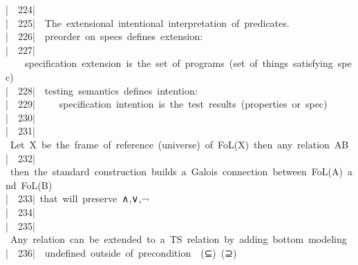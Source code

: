 \documentclass{article}
\newcommand{\syntaxCOMMENTC}[1]{\textcolor[rgb]{0.4,0.0,0.8}{#1}}
\newcommand{\syntaxCOMMENTC}[1]{\textcolor[rgb]{0.4,0.0,0.8}{#1}}
\newcommand{\syntaxCOMMENTC}[1]{\textcolor[rgb]{0.4,0.0,0.8}{#1}}
\newcommand{\syntaxCOMMENTC}[1]{\textcolor[rgb]{0.4,0.0,0.8}{\textbf{#1}}}
\newcommand{\syntaxCOMMENTC}[1]{\textcolor[rgb]{0.4,0.0,0.8}{#1}}
\newcommand{\syntaxCOMMENTC}[1]{\textcolor[rgb]{0.4,0.0,0.8}{#1}}
\newcommand{\syntaxCOMMENTC}[1]{\textcolor[rgb]{0.0,0.0,0.0}{#1}}
\newcommand{\gutter}[1]{\textcolor[rgb]{0,0,0}{{|}#1}}
\newcommand{\gutterH}[1]{\textcolor[rgb]{1,0,0}{{|}#1}}
\begin{document}
\gutter{\ \ 224{|}\ }\syntaxCOMMENTC{{\ }{\ }}\hspace*{\fill}\\
\gutterH{\ \ 225{|}\ }\syntaxCOMMENTC{{\ }The{\ }extensional{\ }intentional{\ }interpretation{\ }of{\ }predicates.}\hspace*{\fill}\\
\gutter{\ \ 226{|}\ }\syntaxCOMMENTC{{\ }preorder{\ }on{\ }specs{\ }defines{\ }extension:}\hspace*{\fill}\\
\gutter{\ \ 227{|}\ }\syntaxCOMMENTC{{\ }{\ }{\ }specification{\ }extension{\ }is{\ }the{\ }set{\ }of{\ }programs{\ }(set{\ }of{\ }things{\ }satisfying{\ }spec)}\hspace*{\fill}\\
\gutter{\ \ 228{|}\ }\syntaxCOMMENTC{{\ }testing{\ }semantics{\ }defines{\ }intention:}\hspace*{\fill}\\
\gutter{\ \ 229{|}\ }\syntaxCOMMENTC{{\ }{\ }{\ }{\ }specification{\ }intention{\ }is{\ }the{\ }test{\ }results{\ }(properties{\ }or{\ }spec)}\hspace*{\fill}\\
\gutterH{\ \ 230{|}\ }\hspace*{\fill}\\
\gutter{\ \ 231{|}\ }\syntaxCOMMENTC{Let{\ }X{\ }be{\ }the{\ }frame{\ }of{\ }reference{\ }(universe){\ }of{\ }FoL(X){\ }then{\ }any{\ }relation{\ }A\usebox{\lessthan}{-}\usebox{\greaterthan}B}\hspace*{\fill}\\
\gutter{\ \ 232{|}\ }\syntaxCOMMENTC{then{\ }the{\ }standard{\ }construction{\ }builds{\ }a{\ }Galois{\ }connection{\ }between{\ }FoL(A){\ }and{\ }FoL(B)}\hspace*{\fill}\\
\gutter{\ \ 233{|}\ }\syntaxCOMMENTC{that{\ }will{\ }preserve{\ }∧,∨,¬}\hspace*{\fill}\\
\gutter{\ \ 234{|}\ }\hspace*{\fill}\\
\gutterH{\ \ 235{|}\ }\syntaxCOMMENTC{Any{\ }relation{\ }can{\ }be{\ }extended{\ }to{\ }a{\ }TS{\ }relation{\ }by{\ }adding{\ }bottom{\ }modeling}\hspace*{\fill}\\
\gutter{\ \ 236{|}\ }\syntaxCOMMENTC{{\ }undefined{\ }outside{\ }of{\ }precondition{\ }{\ }(⊆){\ }(⊇)}\hspace*{\fill}\\
\end{document}
